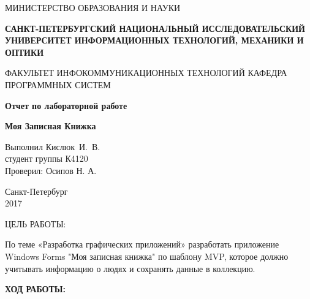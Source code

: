 \documentclass[14pt,a4paper]{extreport}
\begin{document}
	\begin{titlepage}
	\begin{center}	
		\fontsize{14pt}{14pt}\selectfont
		МИНИСТЕРСТВО ОБРАЗОВАНИЯ И НАУКИ\\

		\vspace*{0.6\baselineskip}
		
		\textbf{САНКТ-ПЕТЕРБУРГСКИЙ НАЦИОНАЛЬНЫЙ ИССЛЕДОВАТЕЛЬСКИЙ УНИВЕРСИТЕТ ИНФОРМАЦИОННЫХ ТЕХНОЛОГИЙ, МЕХАНИКИ И ОПТИКИ}
		
		\vspace*{0.6\baselineskip}
		ФАКУЛЬТЕТ ИНФОКОММУНИКАЦИОННЫХ ТЕХНОЛОГИЙ
		КАФЕДРА ПРОГРАММНЫХ СИСТЕМ
	
		\vspace*{7\baselineskip}
		\fontsize{19pt}{18pt}\selectfont
		\textbf{Отчет по лабораторной работе}	
		
		\fontsize{20pt}{18pt}\selectfont
		\textbf{Моя Записная Книжка}\\
		\vspace*{1.15\baselineskip}
		\end{center}
	
	\vspace*{2\baselineskip}
	\begin{flushright}
	\fontsize{14pt}{14pt}\selectfont
	Выполнил Кислюк~И.~В.\\
	студент группы К4120\\
	Проверил: Осипов Н. А.\\
	\end{flushright}
	
	\vspace*{3\baselineskip}
	\begin{center}
	Санкт-Петербург\\
	2017
	\end{center}
	
\end{titlepage}

\fontsize{16pt}{16pt}\selectfont
\begin{center}
ЦЕЛЬ РАБОТЫ:
\end{center}

По теме «Разработка графических приложений» разработать приложение Windows Forms "Моя записная книжка" по шаблону MVP, которое должно учитывать информацию о людях и сохранять данные в коллекцию.
\clearpage

\fontsize{16pt}{16pt}\selectfont
\begin{center}
\bfseries{ХОД РАБОТЫ:}
\end{center}
\end{document}
